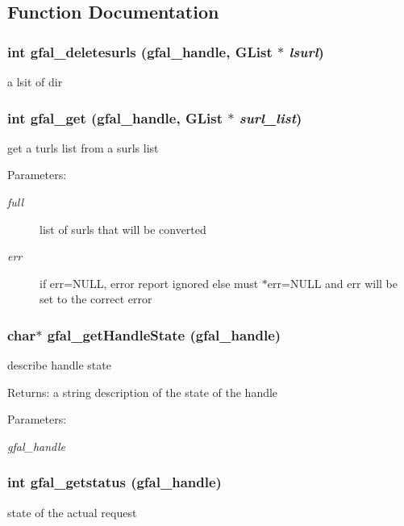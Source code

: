 \subsection{Function Documentation}
\subsubsection{\setlength{\rightskip}{0pt plus 5cm}int gfal\_\-deletesurls (gfal\_\-handle, GList $\ast$ {\em lsurl})}\label{group__srm__group_g629a56f0d644547dbc9fdb2e058476e6}


a lsit of dir 
\subsubsection{\setlength{\rightskip}{0pt plus 5cm}int gfal\_\-get (gfal\_\-handle, GList $\ast$ {\em surl\_\-list})}\label{group__srm__group_g3ae5c2126214ee65695904a7f9fddeb0}


get a turls list from a surls list 

\begin{Desc}
\item[Parameters:]
\begin{description}
\item[{\em full}]list of surls that will be converted \item[{\em err}]if err=NULL, error report ignored else must $\ast$err=NULL and err will be set to the correct error \end{description}
\end{Desc}
\subsubsection{\setlength{\rightskip}{0pt plus 5cm}char$\ast$ gfal\_\-get\-Handle\-State (gfal\_\-handle)}\label{group__srm__group_gb850010181be27c87a5c5b0341412655}


describe handle state 

\begin{Desc}
\item[Returns:]a string description of the state of the handle \end{Desc}
\begin{Desc}
\item[Parameters:]
\begin{description}
\item[{\em gfal\_\-handle}]\end{description}
\end{Desc}
\subsubsection{\setlength{\rightskip}{0pt plus 5cm}int gfal\_\-getstatus (gfal\_\-handle)}\label{group__srm__group_g1f99a22cf6a648d42530bc83d0ac8861}


state of the actual request 